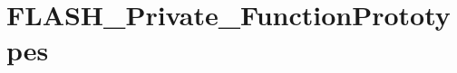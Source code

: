 \hypertarget{group___f_l_a_s_h___private___function_prototypes}{\section{F\-L\-A\-S\-H\-\_\-\-Private\-\_\-\-Function\-Prototypes}
\label{group___f_l_a_s_h___private___function_prototypes}
}
